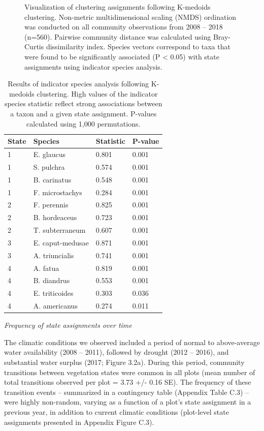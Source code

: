 \documentclass[twoside,12pt,final]{ucthesis-CA2012}
\begin{document}
\begin{ucmainmatter}
\begin{figure}
\caption{Visualization of clustering assignments following K-medoids clustering. Non-metric multidimensional scaling (NMDS) ordination was conducted on all community observations from 2008 -- 2018 (n=560). Pairwise community distance was calculated using Bray-Curtis dissimilarity index. Species vectors correspond to taxa that were found to be significantly associated (P \textless{} 0.05) with state assignments using indicator species analysis. \label{fig-3-1}}
\end{figure}
\begin{table}[ht]
\centering
\begin{tabular}{llll}
  \hline
State & Species & Statistic & P-value \\ 
  \hline
1 & E. glaucus & 0.801 & 0.001 \\ 
  1 & S. pulchra & 0.574 & 0.001 \\ 
  1 & B. carinatus & 0.548 & 0.001 \\ 
  1 & F. microstachys & 0.284 & 0.001 \\ 
  2 & F. perennis & 0.825 & 0.001 \\ 
  2 & B. hordeaceus & 0.723 & 0.001 \\ 
  2 & T. subterraneum & 0.607 & 0.001 \\ 
  3 & E. caput-medusae & 0.871 & 0.001 \\ 
  3 & A. triuncialis & 0.741 & 0.001 \\ 
  4 & A. fatua & 0.819 & 0.001 \\ 
  4 & B. diandrus & 0.553 & 0.001 \\ 
  4 & E. triticoides & 0.303 & 0.036 \\ 
  4 & A. americanus & 0.274 & 0.011 \\ 
   \hline
\end{tabular}
\caption{Results of indicator species analysis following K-medoids clustering. High values of the indicator species statistic reflect strong associations between a taxon and a given state assignment. P-values calculated using 1,000 permutations.} 
\end{table}
\newline

\emph{Frequency of state assignments over time}

The climatic conditions we observed included a period of normal to above-average water availability (2008 -- 2011), followed by drought (2012 -- 2016), and substantial water surplus (2017; Figure 3.2a).
During this period, community transitions between vegetation states were common in all plots (mean number of total transitions observed per plot = 3.73 +/- 0.16 SE).
The frequency of these transition events -- summarized in a contingency table (Appendix Table C.3) -- were highly non-random, varying as a function of a plot's state assignment in a previous year, in addition to current climatic conditions (plot-level state assignments presented in Appendix Figure C.3).


\end{ucmainmatter}
\end{document}
